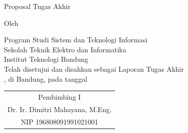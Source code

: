 \clearpage
\pagestyle{empty}

\begin{center}
\smallskip

    \Large \bfseries \MakeUppercase{\thetitle}
    \vfill

    \Large Proposal Tugas Akhir
    \vfill

    \large Oleh

    \Large \theauthor

    \large Program Studi Sistem dan Teknologi Informasi \\
    Sekolah Teknik Elektro dan Informatika \\
    Institut Teknologi Bandung \\

    \vfill
    \normalsize \normalfont
    Telah disetujui dan disahkan sebagai Laporan Tugas Akhir \\
    , di Bandung, pada tanggal 

    \vfill
\begin{tabular}{c}
    Pembimbing I \\[12.5em] %
    Dr. Ir. Dimitri Mahayana, M.Eng. \\[1em] %
    NIP 196808091991021001
\end{tabular}

\end{center}
\clearpage
